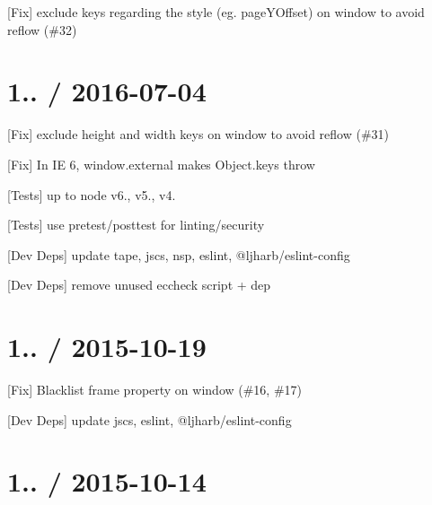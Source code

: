 
\begin{DoxyItemize}
\item \mbox{[}Fix\mbox{]} exclude keys regarding the style (eg. {\ttfamily page\+Y\+Offset}) on {\ttfamily window} to avoid reflow (\#32)
\end{DoxyItemize}

\section*{1.. / 2016-\/07-\/04 }


\begin{DoxyItemize}
\item \mbox{[}Fix\mbox{]} exclude {\ttfamily height} and {\ttfamily width} keys on {\ttfamily window} to avoid reflow (\#31)
\item \mbox{[}Fix\mbox{]} In IE 6, {\ttfamily window.\+external} makes {\ttfamily Object.\+keys} throw
\item \mbox{[}Tests\mbox{]} up to {\ttfamily node} {\ttfamily v6.}, {\ttfamily v5.}, {\ttfamily v4.}
\item \mbox{[}Tests\mbox{]} use pretest/posttest for linting/security
\item \mbox{[}Dev Deps\mbox{]} update {\ttfamily tape}, {\ttfamily jscs}, {\ttfamily nsp}, {\ttfamily eslint}, {\ttfamily @ljharb/eslint-\/config}
\item \mbox{[}Dev Deps\mbox{]} remove unused eccheck script + dep
\end{DoxyItemize}

\section*{1.. / 2015-\/10-\/19 }


\begin{DoxyItemize}
\item \mbox{[}Fix\mbox{]} Blacklist \textquotesingle{}frame\textquotesingle{} property on window (\#16, \#17)
\item \mbox{[}Dev Deps\mbox{]} update {\ttfamily jscs}, {\ttfamily eslint}, {\ttfamily @ljharb/eslint-\/config}
\end{DoxyItemize}

\section*{1.. / 2015-\/10-\/14 }


